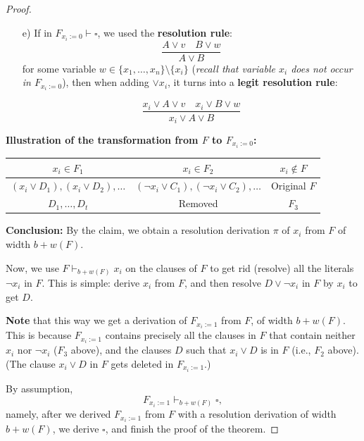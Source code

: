 \begin{proof}
\textbf{ }

\begin{enumerate}
    \item[e)] If in $F_{x_i := 0} \vdash \square$, we used the \textbf{resolution rule}:
    \[
    \frac{A \lor v \quad B \lor w}{A \lor B}
    \]
    for some variable $w \in \{x_1, \dots, x_n\} \setminus \{x_i\}$  
    (\textit{recall that variable $x_i$ does not occur in $F_{x_i := 0}$}),  
    then when adding $\lor x_i$, it turns into a \textbf{legit resolution rule}:

    \[
    \frac{x_i \lor A \lor v \quad x_i \lor B \lor w}{x_i \lor A \lor B}
    \]
\end{enumerate}

\textbf{Illustration of the transformation from $F$ to $F_{x_i := 0}$:}

\begin{center}
    \begin{tabular}{|c|c|c|}
        \hline
        $x_i \in F_1$ & $x_i \in F_2$ & $x_i \notin F$ \\
        \hline
        $(x_i \lor D_1), (x_i \lor D_2), \dots$ & $(\neg x_i \lor C_1), (\neg x_i \lor C_2), \dots$ & Original $F$ \\
        \hline
        $D_1, \dots, D_t$ & Removed & $F_3$ \\
        \hline
    \end{tabular}
\end{center}

\textbf{Conclusion:}  
By the claim, we obtain a resolution derivation $\pi$ of $x_i$ from $F$  
of width $b + w(F)$.


\textbf{ }

Now, we use $F \vdash_{b + w(F)} x_i$ on the clauses of $F$ to get rid (resolve)  
all the literals $\neg x_i$ in $F$.  
This is simple: derive $x_i$ from $F$, and then resolve $D \lor \neg x_i$ in $F$  
by $x_i$ to get $D$.

\textbf{Note} that this way we get a derivation of $F_{x_i := 1}$ from $F$, of width $b + w(F)$.  
This is because $F_{x_i := 1}$ contains precisely all the clauses in $F$ that  
contain neither $x_i$ nor $\neg x_i$ ($F_3$ above), and the clauses $D$  
such that $x_i \lor D$ is in $F$ (i.e., $F_2$ above).  
(The clause $x_i \lor D$ in $F$ gets deleted in $F_{x_i := 1}$.)

By assumption,  
\[
F_{x_i := 1} \vdash_{b + w(F)} \square,
\]
namely, after we derived $F_{x_i := 1}$ from $F$ with a resolution derivation of width $b + w(F)$,  
we derive $\square$, and finish the proof of the theorem.





\mbox{}
\end{proof}

